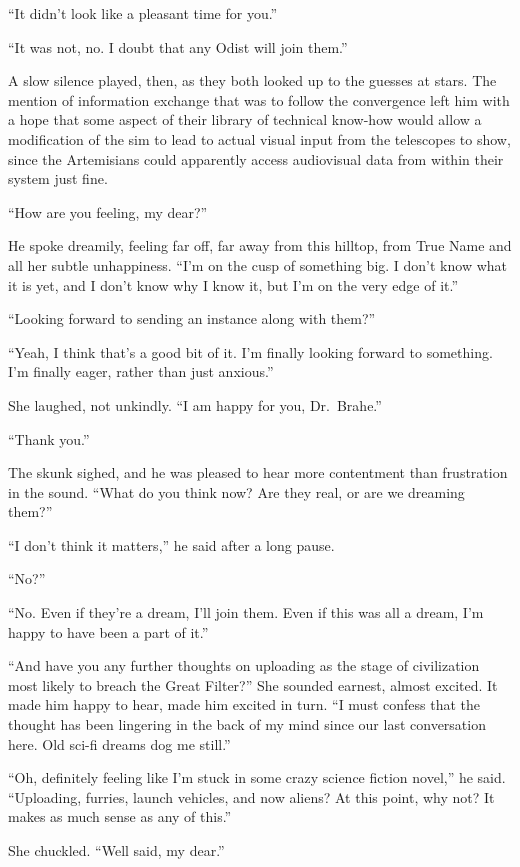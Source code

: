 ``It didn't look like a pleasant time for you.''

``It was not, no. I doubt that any Odist will join them.''

A slow silence played, then, as they both looked up to the guesses at stars. The mention of information exchange that was to follow the convergence left him with a hope that some aspect of their library of technical know-how would allow a modification of the sim to lead to actual visual input from the telescopes to show, since the Artemisians could apparently access audiovisual data from within their system just fine.

``How are you feeling, my dear?''

He spoke dreamily, feeling far off, far away from this hilltop, from True Name and all her subtle unhappiness. ``I'm on the cusp of something big. I don't know what it is yet, and I don't know why I know it, but I'm on the very edge of it.''

``Looking forward to sending an instance along with them?''

``Yeah, I think that's a good bit of it. I'm finally looking forward to something. I'm finally eager, rather than just anxious.''

She laughed, not unkindly. ``I am happy for you, Dr.~Brahe.''

``Thank you.''

The skunk sighed, and he was pleased to hear more contentment than frustration in the sound. ``What do you think now? Are they real, or are we dreaming them?''

``I don't think it matters,'' he said after a long pause.

``No?''

``No. Even if they're a dream, I'll join them. Even if this was all a dream, I'm happy to have been a part of it.''

``And have you any further thoughts on uploading as the stage of civilization most likely to breach the Great Filter?'' She sounded earnest, almost excited. It made him happy to hear, made him excited in turn. ``I must confess that the thought has been lingering in the back of my mind since our last conversation here. Old sci-fi dreams dog me still.''

``Oh, definitely feeling like I'm stuck in some crazy science fiction novel,'' he said. ``Uploading, furries, launch vehicles, and now aliens? At this point, why not? It makes as much sense as any of this.''

She chuckled. ``Well said, my dear.''

